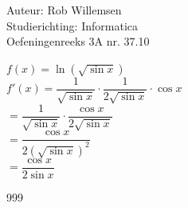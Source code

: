 \documentclass[a4paper]{article}
\begin{document}
\noindent \large Auteur: Rob Willemsen \\
\noindent \large Studierichting: Informatica \\
\noindent \large Oefeningenreeks 3A nr. 37.10 \\

\medskip

\normalsize

$f(x) = \ln\left(\sqrt{\sin x}\right)$ \\

$f'(x) = \dfrac{1}{\sqrt{\sin x}} \cdot \dfrac{1}{2\sqrt{\sin x}} \cdot \cos x$ \\

$= \dfrac{1}{\sqrt{\sin x}} \cdot \dfrac{\cos x}{2\sqrt{\sin x}}$ \\

$= \dfrac{\cos x}{2(\sqrt{\sin x})^2}$ \\

$= \dfrac{\cos x}{2\sin x}$ \\

\begin{thebibliography}{999}
\end{thebibliography}
\end{document}
